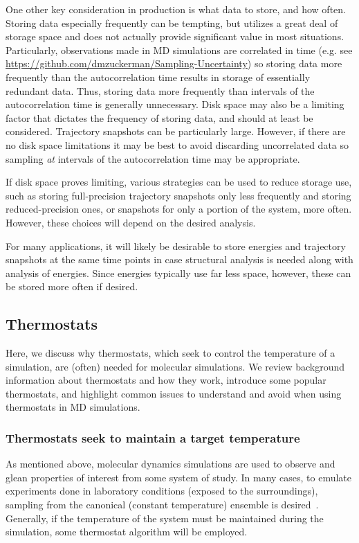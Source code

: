\documentclass[9pt,bestpractices]{livecoms}
\begin{document}
One other key consideration in production is what data to store, and how often.
Storing data especially frequently can be tempting, but utilizes a great deal of storage space and does not actually provide significant value in most situations.
Particularly, observations made in MD simulations are correlated in time (e.g. see \url{https://github.com/dmzuckerman/Sampling-Uncertainty}) so storing data more frequently than the autocorrelation time results in storage of essentially redundant data.
Thus, storing data more frequently than intervals of the autocorrelation time is generally unnecessary.
Disk space may also be a limiting factor that dictates the frequency of storing data, and should at least be considered.
Trajectory snapshots can be particularly large.
However, if there are no disk space limitations it may be best to avoid discarding uncorrelated data so sampling \emph{at} intervals of the autocorrelation time may be appropriate.

If disk space proves limiting, various strategies can be used to reduce storage use, such as storing full-precision trajectory snapshots only less frequently and storing reduced-precision ones, or snapshots for only a portion of the system, more often.
However, these choices will depend on the desired analysis.

For many applications, it will likely be desirable to store energies and trajectory snapshots at the same time points in case structural analysis is needed along with analysis of energies.
Since energies typically use far less space, however, these can be stored more often if desired.

\subsection{Thermostats}
\label{sec:thermostats}

Here, we discuss why thermostats, which seek to control the temperature of a simulation, are (often) needed for molecular simulations. 
We review background information about thermostats and how they work, introduce some popular thermostats, and highlight common issues to understand and avoid when using thermostats in MD simulations.

\subsubsection{Thermostats seek to maintain a target temperature}
As mentioned above, molecular dynamics simulations are used to observe and glean properties of interest from some system of study.
In many cases, to emulate experiments done in laboratory conditions (exposed to the surroundings), sampling from the canonical (constant temperature) ensemble is desired~\cite{thermostatAlgorithms2005}.
Generally, if the temperature of the system must be maintained during the simulation, some thermostat algorithm will be employed. 
\end{document}
